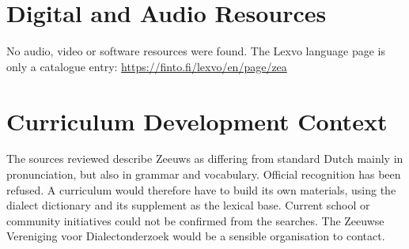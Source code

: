 \documentclass[12pt]{article}
\begin{document}
\section{Digital and Audio Resources}
No audio, video or software resources were found. The Lexvo language page is only a catalogue entry: \url{https://finto.fi/lexvo/en/page/zea}

\section{Curriculum Development Context}
The sources reviewed describe Zeeuws as differing from standard Dutch mainly in pronunciation, but also in grammar and vocabulary. Official recognition has been refused. A curriculum would therefore have to build its own materials, using the dialect dictionary and its supplement as the lexical base. Current school or community initiatives could not be confirmed from the searches. The Zeeuwse Vereniging voor Dialectonderzoek would be a sensible organisation to contact.
\end{document}

